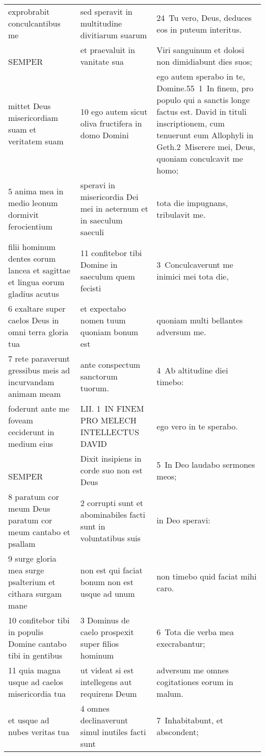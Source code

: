 \documentclass{article}
\begin{document}
\begin{longtable}{@{}p{}p{}p{}@{}}
exprobrabit conculcantibus me	&	sed speravit in multitudine divitiarum suarum	&	24 Tu vero, Deus, deduces eos in puteum interitus.	\\
    SEMPER	&	et praevaluit in vanitate sua	&	Viri sanguinum et dolosi non dimidiabunt dies suos;	\\
mittet Deus misericordiam suam et veritatem suam	&	10 ego autem sicut oliva fructifera in domo Domini	&	ego autem sperabo in te, Domine.55 1 In finem, pro populo qui a sanctis longe factus est. David in tituli inscriptionem, cum tenuerunt eum Allophyli in Geth.2 Miserere mei, Deus, quoniam conculcavit me homo;	\\
5 anima mea in medio leonum dormivit ferocientium	&	speravi in misericordia Dei mei in aeternum et in saeculum saeculi	&	tota die impugnans, tribulavit me.	\\
filii hominum dentes eorum lancea et sagittae et lingua eorum gladius acutus	&	11 confitebor tibi Domine in saeculum quem fecisti	&	3 Conculcaverunt me inimici mei tota die,	\\
6 exaltare super caelos Deus in omni terra gloria tua	&	et expectabo nomen tuum quoniam bonum est	&	quoniam multi bellantes adversum me.	\\
7 rete paraverunt gressibus meis ad incurvandam animam meam	&	ante conspectum sanctorum tuorum.	&	4 Ab altitudine diei timebo:	\\
foderunt ante me foveam ceciderunt in medium eius	&	LII. 1 IN FINEM PRO MELECH INTELLECTUS DAVID	&	ego vero in te sperabo.	\\
    SEMPER	&	Dixit insipiens in corde suo non est Deus	&	5 In Deo laudabo sermones meos;	\\
8 paratum cor meum Deus paratum cor meum cantabo et psallam	&	2 corrupti sunt et abominabiles facti sunt in voluntatibus suis	&	in Deo speravi:	\\
9 surge gloria mea surge psalterium et cithara surgam mane	&	non est qui faciat bonum non est usque ad unum	&	non timebo quid faciat mihi caro.	\\
10 confitebor tibi in populis Domine cantabo tibi in gentibus	&	3 Dominus de caelo prospexit super filios hominum	&	6 Tota die verba mea execrabantur;	\\
11 quia magna usque ad caelos misericordia tua	&	ut videat si est intellegens aut requirens Deum	&	adversum me omnes cogitationes eorum in malum.	\\
et usque ad nubes veritas tua	&	4 omnes declinaverunt simul inutiles facti sunt	&	7 Inhabitabunt, et abscondent;	\\

\end{longtable}
\end{document}
